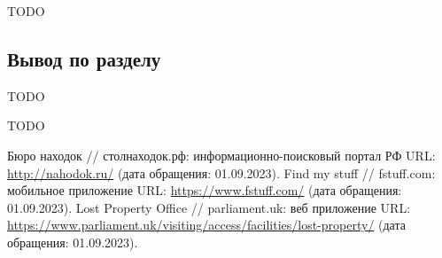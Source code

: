 \documentclass{mirea}
\begin{document}
TODO

\subsection*{Вывод по разделу}

TODO

TODO



\begin{thebibliography}{99\kern\bibindent}
	 Бюро находок // столнаходок.рф: информационно-поисковый портал РФ URL: \url{http://nahodok.ru/} (дата обращения: 01.09.2023).
	 Find my stuff // fstuff.com: мобильное приложение URL: \url{https://www.fstuff.com/} (дата обращения: 01.09.2023).
	 Lost Property Office // parliament.uk: веб приложение URL: \url{https://www.parliament.uk/visiting/access/facilities/lost-property/} (дата обращения: 01.09.2023).
\end{thebibliography}
\end{document}
